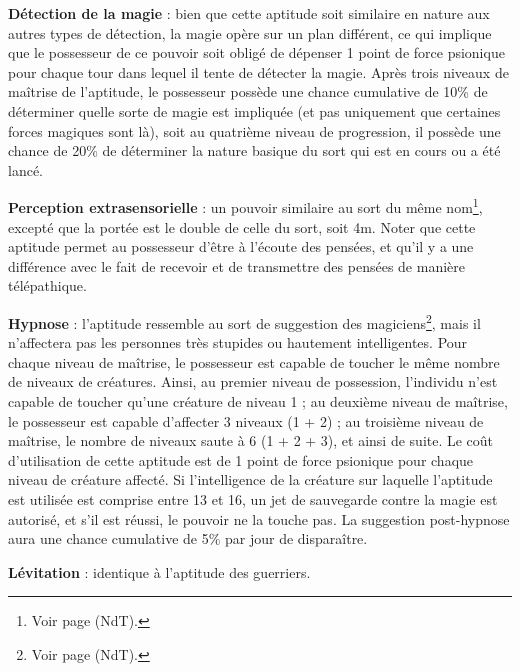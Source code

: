 {\bigskip

\textbf{Détection de la magie} : bien que cette aptitude soit similaire en nature aux autres types de détection, la magie opère sur un plan différent, ce qui implique que le possesseur de ce pouvoir soit obligé de dépenser 1 point de force psionique pour chaque tour dans lequel il tente de détecter la magie. Après trois niveaux de maîtrise de l'aptitude, le possesseur possède une chance cumulative de 10\% de déterminer quelle sorte de magie est impliquée (et pas uniquement que certaines forces magiques sont là), soit au quatrième niveau de progression, il possède une chance de 20\% de déterminer la nature basique du sort qui est en cours ou a été lancé.

\bigskip

\textbf{Perception extrasensorielle} : un pouvoir similaire au sort du même nom\footnote{Voir page \pageref{sort-esp} (NdT).}, excepté que la portée est le double de celle du sort, soit 4m. Noter que cette aptitude permet au possesseur d'être \og à l'écoute \fg{} des pensées, et qu'il y a une différence avec le fait de recevoir et de transmettre des pensées de manière télépathique.

\bigskip

\textbf{Hypnose} : l'aptitude ressemble au sort de suggestion des magiciens\footnote{Voir page \pageref{sort-suggestion} (NdT).}, mais il n'affectera pas les personnes très stupides ou hautement intelligentes. Pour chaque niveau de maîtrise, le possesseur est capable de toucher le même nombre de niveaux de créatures. Ainsi, au premier niveau de possession, l'individu n'est capable de toucher qu'une créature de niveau 1 ; au deuxième niveau de maîtrise, le possesseur est capable d'affecter 3 niveaux (1 + 2) ; au troisième niveau de maîtrise, le nombre de niveaux saute à 6 (1 + 2 + 3), et ainsi de suite. Le coût d'utilisation de cette aptitude est de 1 point de force psionique pour chaque niveau de créature affecté. Si l'intelligence de la créature sur laquelle l'aptitude est utilisée est comprise entre 13 et 16, un jet de sauvegarde contre la magie est autorisé, et s'il est réussi, le pouvoir ne la touche pas. La suggestion post-hypnose aura une chance cumulative de 5\% par jour de disparaître.

\bigskip

\textbf{Lévitation} : identique à l'aptitude des guerriers.

}
